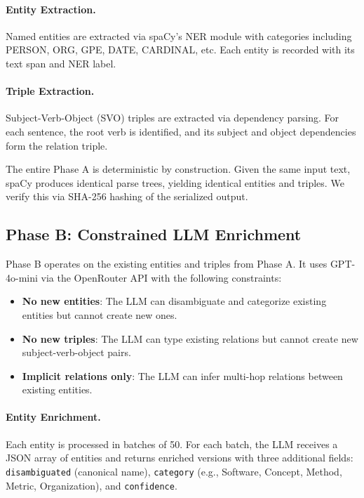 \documentclass{article}
\begin{document}
\paragraph{Entity Extraction.} Named entities are extracted via spaCy's NER module with categories including PERSON, ORG, GPE, DATE, CARDINAL, etc. Each entity is recorded with its text span and NER label.

\paragraph{Triple Extraction.} Subject-Verb-Object (SVO) triples are extracted via dependency parsing. For each sentence, the root verb is identified, and its subject and object dependencies form the relation triple.

The entire Phase A is deterministic by construction. Given the same input text, spaCy produces identical parse trees, yielding identical entities and triples. We verify this via SHA-256 hashing of the serialized output.

\subsection{Phase B: Constrained LLM Enrichment}

Phase B operates on the existing entities and triples from Phase A. It uses GPT-4o-mini via the OpenRouter API with the following constraints:
\begin{itemize}
    \item \textbf{No new entities}: The LLM can disambiguate and categorize existing entities but cannot create new ones.
    \item \textbf{No new triples}: The LLM can type existing relations but cannot create new subject-verb-object pairs.
    \item \textbf{Implicit relations only}: The LLM can infer multi-hop relations between existing entities.
\end{itemize}

\paragraph{Entity Enrichment.} Each entity is processed in batches of 50. For each batch, the LLM receives a JSON array of entities and returns enriched versions with three additional fields: \texttt{disambiguated} (canonical name), \texttt{category} (e.g., Software, Concept, Method, Metric, Organization), and \texttt{confidence}.
\end{document}
